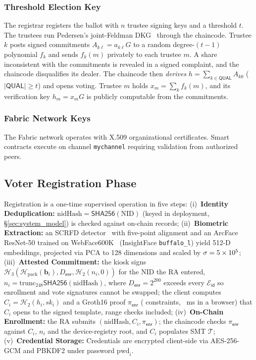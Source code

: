 \documentclass[10pt,letterpaper,journal]{IEEEtran}
\begin{document}
\subsubsection{Threshold Election Key}
The registrar registers the ballot with $n$ trustee signing keys and a threshold $t$. The trustees run Pedersen's joint-Feldman DKG~\cite{Pedersen1991,Feldman1987} through the chaincode. Trustee $k$ posts signed commitments $A_{k\ell} = a_{k\ell} G$ to a random degree-$(t-1)$ polynomial $f_k$ and sends $f_k(m)$ privately to each trustee $m$. A share inconsistent with the commitments is revealed in a signed complaint, and the chaincode disqualifies its dealer. The chaincode then \emph{derives} $h = \sum_{k \in \mathsf{QUAL}} A_{k0}$ ($|\mathsf{QUAL}| \ge t$) and opens voting. Trustee $m$ holds $x_m = \sum_k f_k(m)$, and its verification key $h_m = x_m G$ is publicly computable from the commitments.

\subsubsection{Fabric Network Keys}
The Fabric network operates with X.509 organizational certificates. Smart contracts execute on channel \texttt{mychannel} requiring validation from authorized peers. 

\subsection{Voter Registration Phase}
Registration is a one-time supervised operation in five steps:
(i)~\textbf{Identity Deduplication:} $\text{nidHash} = \mathsf{SHA256}(\text{NID})$ (keyed in deployment, \S\ref{sec:system_model}) is checked against on-chain records;
(ii)~\textbf{Biometric Extraction:} an SCRFD detector~\cite{Guo2022SCRFD} with five-point alignment and an ArcFace ResNet-50 trained on WebFace600K~\cite{Zhu2021WebFace260M} (InsightFace \texttt{buffalo\_l}) yield 512-D embeddings, projected via PCA to 128 dimensions and scaled by $\sigma = 5 \times 10^{5}$;
(iii)~\textbf{Attested Commitment:} the kiosk signs $\mathcal{H}_3(\mathcal{H}_{\text{pack}}(\mathbf{b}_i), D_{\mathsf{enr}}, \mathcal{H}_2(n_i, 0))$ for the NID the RA entered, $n_i = \mathrm{trunc}_{248}\mathsf{SHA256}(\text{nidHash})$, where $D_{\mathsf{enr}} = 2^{200}$ exceeds every $\mathcal{E}_{\mathsf{id}}$ so enrollment and vote signatures cannot be swapped; the client computes $C_i = \mathcal{H}_2(h_i, sk_i)$ and a Groth16 proof $\pi_{\mathsf{enr}}$ (\nEnrollConstraints{} constraints, \nBrowserEnrollMs~ms in a browser) that $C_i$ opens to the signed template, range checks included;
(iv)~\textbf{On-Chain Enrollment:} the RA submits $(\text{nidHash}, C_i, \pi_{\mathsf{enr}})$; the chaincode checks $\pi_{\mathsf{enr}}$ against $C_i$, $n_i$ and the device-registry root, and $C_i$ populates SMT $\mathcal{T}$;
(v)~\textbf{Credential Storage:} Credentials are encrypted client-side via AES-256-GCM and PBKDF2 under password $\text{pwd}_i$.
\end{document}
